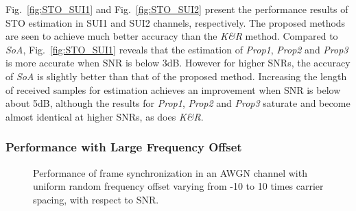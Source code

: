 Fig.~\ref{fig:STO_SUI1} and  Fig.~\ref{fig:STO_SUI2} present the performance results of STO estimation in SUI1 and SUI2 channels, respectively.
The proposed methods are seen to achieve much better accuracy than the \textit{K\&R} method.
Compared to \textit{SoA}, Fig.~\ref{fig:STO_SUI1} reveals that the estimation of \textit{Prop1}, \textit{Prop2} and \textit{Prop3} is more accurate when SNR is below 3{\thinspace}dB.
However for higher SNRs, the accuracy of \textit{SoA} is slightly better than that of the proposed method.
Increasing the length of received samples for estimation achieves an improvement when SNR is below about 5{\thinspace}dB, although the results for \textit{Prop1}, \textit{Prop2} and \textit{Prop3} saturate and become almost identical at higher SNRs, as does \textit{K\&R}.

		\subsubsection{Performance with Large Frequency Offset}

\begin{figure}[h]
\centering
\caption{Performance of frame synchronization in an AWGN channel with uniform random frequency offset varying from -10 to 10 times carrier spacing, with respect to SNR.}
\label{fig:STO_AWGN_Fre}
\end{figure}


